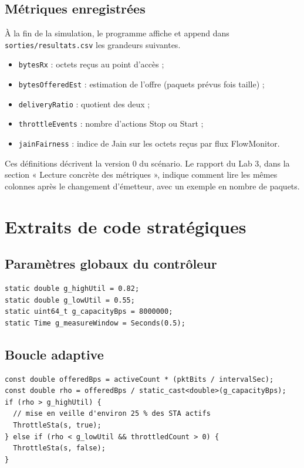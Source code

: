 \documentclass[11pt,a4paper]{article}
\begin{document}
\subsection{Métriques enregistrées}

À la fin de la simulation, le programme affiche et append dans \texttt{sorties/resultats.csv} les grandeurs suivantes.
\begin{itemize}
  \item \texttt{bytesRx} : octets reçus au point d'accès ;
  \item \texttt{bytesOfferedEst} : estimation de l'offre (paquets prévus fois taille) ;
  \item \texttt{deliveryRatio} : quotient des deux ;
  \item \texttt{throttleEvents} : nombre d'actions Stop ou Start ;
  \item \texttt{jainFairness} : indice de Jain sur les octets reçus par flux FlowMonitor.
\end{itemize}

Ces définitions décrivent la version 0 du scénario. Le rapport du Lab 3, dans la section « Lecture concrète des métriques », indique comment lire les mêmes colonnes après le changement d'émetteur, avec un exemple en nombre de paquets.

\section{Extraits de code stratégiques}

\subsection{Paramètres globaux du contrôleur}

\begin{lstlisting}
static double g_highUtil = 0.82;
static double g_lowUtil = 0.55;
static uint64_t g_capacityBps = 8000000;
static Time g_measureWindow = Seconds(0.5);
\end{lstlisting}

\subsection{Boucle adaptive}

\begin{lstlisting}
const double offeredBps = activeCount * (pktBits / intervalSec);
const double rho = offeredBps / static_cast<double>(g_capacityBps);
if (rho > g_highUtil) {
  // mise en veille d'environ 25 % des STA actifs
  ThrottleSta(s, true);
} else if (rho < g_lowUtil && throttledCount > 0) {
  ThrottleSta(s, false);
}
\end{lstlisting}
\end{document}
